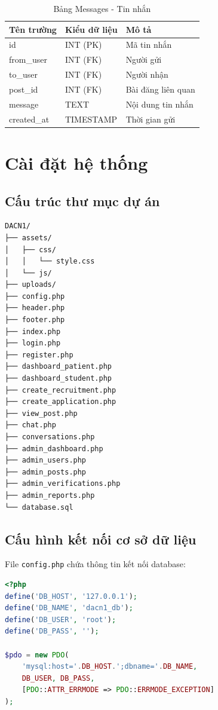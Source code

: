 \documentclass[a4paper,12pt]{report}
\begin{document}
\begin{table}[H]
\centering
\caption{Bảng Messages - Tin nhắn}
\begin{tabular}{|l|l|l|}
\hline
\textbf{Tên trường} & \textbf{Kiểu dữ liệu} & \textbf{Mô tả} \\
\hline
id & INT (PK) & Mã tin nhắn \\
from\_user & INT (FK) & Người gửi \\
to\_user & INT (FK) & Người nhận \\
post\_id & INT (FK) & Bài đăng liên quan \\
message & TEXT & Nội dung tin nhắn \\
created\_at & TIMESTAMP & Thời gian gửi \\
\hline
\end{tabular}
\end{table}

\section{Cài đặt hệ thống}

\subsection{Cấu trúc thư mục dự án}

\begin{verbatim}
DACN1/
├── assets/
│   ├── css/
│   │   └── style.css
│   └── js/
├── uploads/
├── config.php
├── header.php
├── footer.php
├── index.php
├── login.php
├── register.php
├── dashboard_patient.php
├── dashboard_student.php
├── create_recruitment.php
├── create_application.php
├── view_post.php
├── chat.php
├── conversations.php
├── admin_dashboard.php
├── admin_users.php
├── admin_posts.php
├── admin_verifications.php
├── admin_reports.php
└── database.sql
\end{verbatim}

\subsection{Cấu hình kết nối cơ sở dữ liệu}

File \texttt{config.php} chứa thông tin kết nối database:

\begin{lstlisting}[language=PHP]
<?php
define('DB_HOST', '127.0.0.1');
define('DB_NAME', 'dacn1_db');
define('DB_USER', 'root');
define('DB_PASS', '');

$pdo = new PDO(
    'mysql:host='.DB_HOST.';dbname='.DB_NAME,
    DB_USER, DB_PASS,
    [PDO::ATTR_ERRMODE => PDO::ERRMODE_EXCEPTION]
);
\end{lstlisting}
\end{document}
